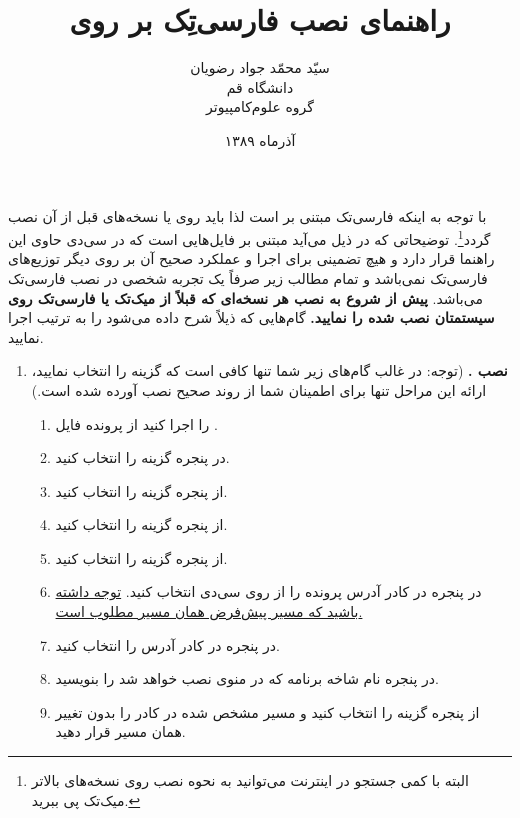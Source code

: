 \documentclass[a4paper]{article}
\title{ راهنمای نصب فارسی‌تِک بر روی \lr{MiK\TeX{}2.4}}
\author{سیّد محمّد جواد رضویان\\
دانشگاه قم\\
گروه علوم‌کامپیوتر}
\date{آذرماه ۱۳۸۹}
\begin{document}
\maketitle
با توجه به اینکه فارسی‌تک مبتنی بر  است لذا باید روی  یا نسخه‌های قبل از آن نصب گردد\footnote{البته با کمی جستجو در اینترنت می‌توانید به نحوه نصب روی نسخه‌های بالاتر میک‌تک پی ببرید.}. توضیحاتی که در ذیل می‌آید مبتنی بر فایل‌هایی است که در سی‌دی حاوی این راهنما قرار دارد و هیچ تضمینی برای اجرا و عملکرد صحیح آن بر روی دیگر  توزیع‌های فارسی‌تک نمی‌باشد و تمام مطالب زیر صرفاً یک تجربه شخصی در نصب فارسی‌تک می‌باشد. \textbf{پیش از شروع به نصب هر نسخه‌ای که قبلاً از میک‌تک یا فارسی‌تک روی سیستمتان نصب شده را  نمایید.} گام‌هایی که ذیلاً  شرح داده می‌شود را به ترتیب اجرا نمایید.
\begin{enumerate}
	\item 
	\textbf{ نصب .}	 (توجه: در غالب گام‌های زیر شما تنها کافی است که گزینه  را انتخاب نمایید، ارائه این مراحل تنها برای اطمینان شما از روند صحیح نصب آورده شده است.)
		\begin{enumerate}
			\item 
		از پرونده   ‬فایل ‪ ‬را اجرا کنید.‬
			\item	
		در پنجره  گزینه  را انتخاب کنید.
			\item
		از پنجره  گزینه  را انتخاب کنید.
			\item
		از پنجره  گزینه  را انتخاب کنید.
			\item
		از پنجره  گزینه  را انتخاب کنید.
			\item
		در پنجره  در کادر   آدرس پرونده  را از روی سی‌دی انتخاب کنید.
\linebreak \underline{توجه داشته باشید که مسیر پیش‌فرض همان مسیر مطلوب است.}
			\item
		در پنجره  در کادر   آدرس  را انتخاب کنید.
			\item 
		در پنجره  نام شاخه‌ برنامه که در منوی  نصب خواهد شد را بنویسید.
			\item 
		از پنجره  گزینه  را انتخاب کنید و مسیر مشخص شده در کادر  را بدون تغییر همان مسیر  قرار دهید.

\end{enumerate}
\end{enumerate}
\end{document}
